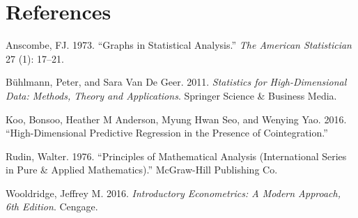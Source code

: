 \documentclass[12pt,]{article}
\begin{document}
\section*{References}\label{references}

\hypertarget{refs}{}
\hypertarget{ref-ANS73}{}
Anscombe, FJ. 1973. ``Graphs in Statistical Analysis.'' \emph{The
American Statistician} 27 (1): 17--21.

\hypertarget{ref-buhlmann}{}
Bühlmann, Peter, and Sara Van De Geer. 2011. \emph{Statistics for
High-Dimensional Data: Methods, Theory and Applications}. Springer
Science \& Business Media.

\hypertarget{ref-koo}{}
Koo, Bonsoo, Heather M Anderson, Myung Hwan Seo, and Wenying Yao. 2016.
``High-Dimensional Predictive Regression in the Presence of
Cointegration.''

\hypertarget{ref-rudin}{}
Rudin, Walter. 1976. ``Principles of Mathematical Analysis
(International Series in Pure \& Applied Mathematics).'' McGraw-Hill
Publishing Co.

\hypertarget{ref-wooldridge2016}{}
Wooldridge, Jeffrey M. 2016. \emph{Introductory Econometrics: A Modern
Approach, 6th Edition}. Cengage.
\end{document}
